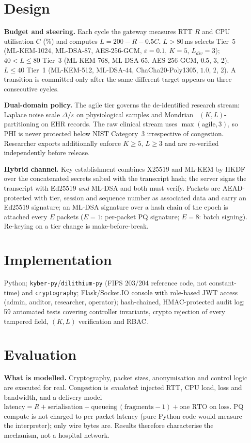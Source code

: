 \documentclass[10pt,twocolumn]{article}
\begin{document}
\section{Design}
\textbf{Budget and steering.} Each cycle the gateway measures RTT $R$ and CPU utilisation $C$ (\%) and computes $L=200-R-0.5C$. $L>80$\,ms selects Tier~5 (ML-KEM-1024, ML-DSA-87, AES-256-GCM, $\varepsilon=0.1$, $K=5$, $L_{div}=3$); $40<L\le80$ Tier~3 (ML-KEM-768, ML-DSA-65, AES-256-GCM, $0.5$, 3, 2); $L\le40$ Tier~1 (ML-KEM-512, ML-DSA-44, ChaCha20-Poly1305, $1.0$, 2, 2). A transition is committed only after the same different target appears on three consecutive cycles.

\textbf{Dual-domain policy.} The agile tier governs the de-identified research stream: Laplace noise scale $\Delta/\varepsilon$ on physiological samples and Mondrian~\cite{mondrian} $(K,L)$-partitioning on EHR records. The raw clinical stream uses $\max(\text{agile},3)$, so PHI is never protected below NIST Category~3 irrespective of congestion. Researcher exports additionally enforce $K\ge5$, $L\ge3$ and are re-verified independently before release.

\textbf{Hybrid channel.} Key establishment combines X25519 and ML-KEM by HKDF over the concatenated secrets salted with the transcript hash; the server signs the transcript with Ed25519 \emph{and} ML-DSA and both must verify. Packets are AEAD-protected with tier, session and sequence number as associated data and carry an Ed25519 signature; an ML-DSA signature over a hash chain of the epoch is attached every $E$ packets ($E=1$: per-packet PQ signature; $E=8$: batch signing). Re-keying on a tier change is make-before-break.

\section{Implementation}
Python; \texttt{kyber-py}/\texttt{dilithium-py} (FIPS 203/204 reference code, not constant-time) and \texttt{cryptography}; Flask/Socket.IO console with role-based JWT access (admin, auditor, researcher, operator); hash-chained, HMAC-protected audit log; 59 automated tests covering controller invariants, crypto rejection of every tampered field, $(K,L)$ verification and RBAC.

\section{Evaluation}
\textbf{What is modelled.} Cryptography, packet sizes, anonymisation and control logic are executed for real. Congestion is \emph{emulated}: injected RTT, CPU load, loss and bandwidth, and a delivery model $\text{latency}=R+\text{serialisation}+\text{queueing}\,(\text{fragments}-1)+\text{one RTO on loss}$. PQ compute is not charged to per-packet latency (pure-Python code would measure the interpreter); only wire bytes are. Results therefore characterise the mechanism, not a hospital network.
\end{document}
